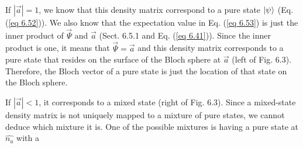 \documentclass{article}
\begin{document}
If $|\vec{a}|=1$, we know that this density matrix correspond to a pure state $\ket{\psi}$
(Eq. (\ref{eq 6.52})). We also know that the expectation value in Eq. (\ref{eq 6.53}) is just
the inner product of $\vec{\Psi}$ and $\vec{a}$ (Sect. 6.5.1 and Eq. (\ref{eq 6.41})).
Since the inner product is one, it means that $\vec{\Psi}=\vec{a}$ and this density matrix corresponds
to a pure state that resides on the surface of the Bloch sphere at $\vec{a}$ (left of Fig. 6.3). Therefore,
the Bloch vector of a pure state is just the location of that state on the Bloch sphere.

If $|\vec{a}|<1$, it corresponds to a mixed state (right of Fig. 6.3). Since a mixed-state
density matrix is not uniquely mapped to a mixture of pure states,
we cannot deduce which mixture it is. One of the possible mixtures is having a pure
state at $\hat{n_a}$ with a
\end{document}
